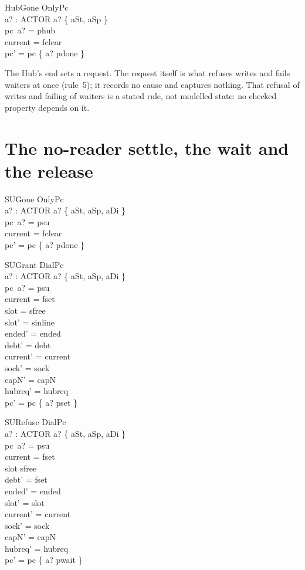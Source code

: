 \documentclass[a4paper,10pt,fleqn]{article}
\begin{document}
\begin{schema}{HubGone}
  OnlyPc \\
  a? : ACTOR
\where
  a? \in \{ aSt, aSp \} \\
  pc~a? = phub \\
  current = fclear \\
  pc' = pc \oplus \{ a? \mapsto pdone \}
\end{schema}

The Hub's end sets a request.  The request itself is what refuses writes and
fails waiters at once (rule~5); it records no cause and captures nothing.  That
refusal of writes and failing of waiters is a stated rule, not modelled state:
no checked property depends on it.

\section{The no-reader settle, the wait and the release}

\begin{schema}{SUGone}
  OnlyPc \\
  a? : ACTOR
\where
  a? \in \{ aSt, aSp, aDi \} \\
  pc~a? = psu \\
  current = fclear \\
  pc' = pc \oplus \{ a? \mapsto pdone \}
\end{schema}

\begin{schema}{SUGrant}
  DialPc \\
  a? : ACTOR
\where
  a? \in \{ aSt, aSp, aDi \} \\
  pc~a? = psu \\
  current = fset \\
  slot = sfree \\
  slot' = sinline \\
  ended' = ended \\
  debt' = debt \\
  current' = current \\
  sock' = sock \\
  capN' = capN \\
  hubreq' = hubreq \\
  pc' = pc \oplus \{ a? \mapsto pset \}
\end{schema}

\begin{schema}{SURefuse}
  DialPc \\
  a? : ACTOR
\where
  a? \in \{ aSt, aSp, aDi \} \\
  pc~a? = psu \\
  current = fset \\
  slot \neq sfree \\
  debt' = fset \\
  ended' = ended \\
  slot' = slot \\
  current' = current \\
  sock' = sock \\
  capN' = capN \\
  hubreq' = hubreq \\
  pc' = pc \oplus \{ a? \mapsto pwait \}
\end{schema}
\end{document}
